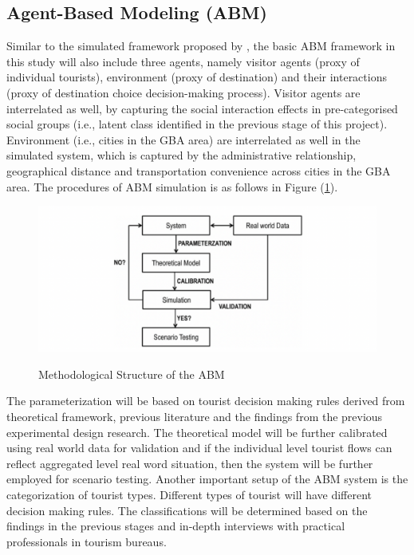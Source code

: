 \documentclass[11pt,a4paper]{amsart}
\theoremstyle{plain}
\theoremstyle{definition}
\begin{document}
\subsection{Agent-Based Modeling (ABM)}\hfill\par 
\noindent Similar to the simulated framework proposed by \textcite{liAgentBasedModelingSpatial2021}, the basic ABM framework in this study will also include three agents, namely visitor agents (proxy of individual tourists), environment (proxy of destination) and their interactions (proxy of destination choice decision-making process). Visitor agents are interrelated as well, by capturing the social interaction effects in pre-categorised social groups (i.e., latent class identified in the previous stage of this project). Environment (i.e., cities in the GBA area) are interrelated as well in the simulated system, which is captured by the administrative relationship, geographical distance and transportation convenience across cities in the GBA area. The procedures of ABM simulation is as follows in Figure (\ref{F:meth_stul_ABM}).

\begin{figure}[hbt]
	{\centering \includegraphics[scale=0.58]{meth_stul_ABM}}
	\caption{Methodological Structure of the ABM}\label{F:meth_stul_ABM}
\end{figure}

\noindent The parameterization will be based on tourist decision making rules derived from theoretical framework, previous literature and the findings from the previous experimental design research. The theoretical model will be further calibrated using real world data for validation and if the individual level tourist flows can reflect aggregated level real word situation, then the system will be further employed for scenario testing. Another important setup of  the ABM system is the categorization of tourist types. Different types of tourist will have different decision making rules. The classifications will be determined based on the findings in the previous stages and in-depth interviews with practical professionals in tourism bureaus. 
\end{document}
